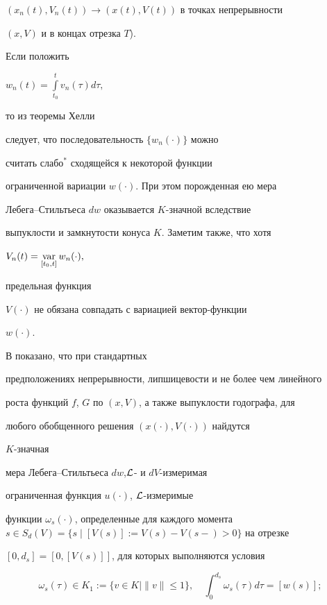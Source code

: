 $(x_n(t),V_n(t)) \rightarrow (x(t),V(t))$ в точках непрерывности


$(x,V)$ и в концах отрезка $T$).


\medskip





Если положить


$w_n(t)=\int\limits_{t_0}^{t}v_n(\tau)d\tau,$


то из теоремы Хелли


следует, что последовательность $\{ w_n(\cdot)\}$ можно


считать слабо$^{\ast}$ сходящейся к некоторой функции


ограниченной вариации $w(\cdot)$. При этом порожденная ею мера


Лебега--Стильтьеса $d w$ оказывается $K$-значной вследствие


выпуклости и замкнутости конуса $K$. Заметим также, что хотя


$V_n(t)=\var\limits_{[t_0,t]} w_n(\cdot),$


предельная функция


$V(\cdot)$ не обязана совпадать с вариацией вектор-функции


$w(\cdot)$.





В \cite{80} показано, что при стандартных


предположениях непрерывности, липшицевости и не более чем линейного


роста функций $f$, $G$ по $(x,V)$, а также выпуклости годографа, для


любого обобщенного решения $(x(\cdot), V(\cdot))$ найдутся


$K$-значная


мера Лебега--Стильтьеса $dw$,\linebreak $\cal{L}$- и $dV$-измеримая


ограниченная функция $u(\cdot)$, $\cal{L}$-измеримые


функции $\omega_s(\cdot)$, определенные для каждого момента $s \in


S_d(V)=\{s\mid [V(s)]:=V(s)-V(s-)>0\}$ на отрезке


$[0,d_s]=[0,[V(s)]]$, для которых выполняются условия


\begin{equation}


\omega_s(\tau) \in K_1:=\{v\in K\mid \|v\|\leq 1\}, \quad


\int_0^{d_s}\omega_s(\tau)d\tau=[ w (s)]; \label{B.4}\end{equation}


